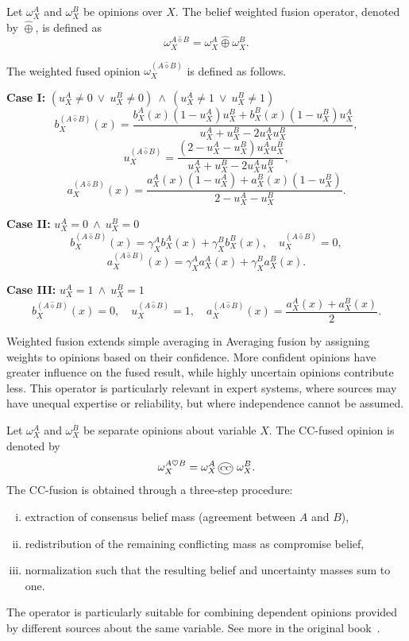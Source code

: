 \begin{definition}
\label{def:weighted_fuse}
Let $\omega_X^A$ and $\omega_X^B$ be opinions over $X$.
The belief weighted fusion operator, denoted by $\hat{\oplus} $, is defined as
\[
\omega_X^{A\hat{\diamond} B} = \omega_X^A \hat{\oplus} \omega_X^B .
\]

The weighted fused opinion $\omega_X^{(A\hat{\diamond} B)}$ is defined as follows.

\textbf{Case I:} $(u_X^A\neq0 \ \vee\ u_X^B\neq0)\ \wedge\ (u_X^A\neq1 \ \vee\ u_X^B\neq1)$
\[
b_X^{(A\hat{\diamond} B)}(x)=
\frac{b_X^A(x)(1-u_X^A)u_X^B+b_X^B(x)(1-u_X^B)u_X^A}
{u_X^A+u_X^B-2u_X^A u_X^B},
\]
\[
u_X^{(A\hat{\diamond} B)}=
\frac{(2-u_X^A-u_X^B)u_X^A u_X^B}
{u_X^A+u_X^B-2u_X^A u_X^B},
\]
\[
a_X^{(A\hat{\diamond} B)}(x)=
\frac{a_X^A(x)(1-u_X^A)+a_X^B(x)(1-u_X^B)}
{2-u_X^A-u_X^B}.
\]

\textbf{Case II:} $u_X^A=0 \ \wedge\ u_X^B=0$
\[
b_X^{(A\hat{\diamond} B)}(x)=\gamma_X^A b_X^A(x)+\gamma_X^B b_X^B(x),
\quad
u_X^{(A\hat{\diamond} B)}=0,
\]
\[
a_X^{(A\hat{\diamond} B)}(x)=\gamma_X^A a_X^A(x)+\gamma_X^B a_X^B(x).
\]

\textbf{Case III:} $u_X^A=1 \ \wedge\ u_X^B=1$
\[
b_X^{(A\hat{\diamond} B)}(x)=0,\quad
u_X^{(A\hat{\diamond} B)}=1,\quad
a_X^{(A\hat{\diamond} B)}(x)=\frac{a_X^A(x)+a_X^B(x)}{2}.
\]

\end{definition}
Weighted fusion extends simple averaging in Averaging fusion by assigning weights to opinions based on their confidence. More confident opinions have greater influence on the fused result, while highly uncertain opinions contribute less. This operator is particularly relevant in expert systems, where sources may have unequal expertise or reliability, but where independence cannot be assumed.


\begin{definition}
\label{def:c_and_c_fuse}
Let $\omega_X^A$ and $\omega_X^B$ be separate opinions about variable $X$.
The CC-fused opinion is denoted by
\[
\omega_X^{A\heartsuit  B}=\omega_X^A \, \occ \, \omega_X^B .
\]
The CC-fusion is obtained through a three-step procedure:
\begin{enumerate}[i)]
    \item extraction of consensus belief mass (agreement between $A$ and $B$),
    \item redistribution of the remaining conflicting mass as compromise belief,
    \item  normalization such that the resulting belief and uncertainty masses
sum to one.
\end{enumerate}
The operator is particularly suitable for combining
dependent opinions provided by different sources about the same variable.
See more in the original book~\cite{josang2016subjective}.
\end{definition}

